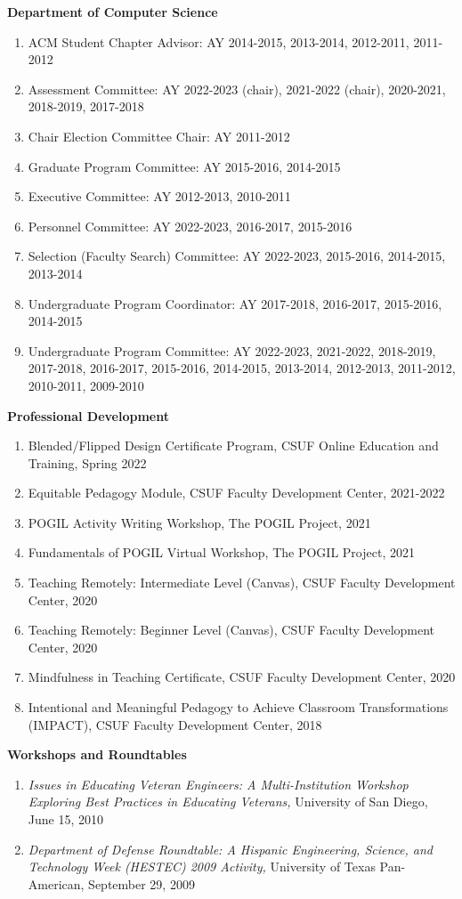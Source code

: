 \documentclass[11pt]{letter}
\begin{document}
\textbf{Department of Computer Science}
\begin{enumerate}
\item ACM Student Chapter Advisor: AY 2014-2015, 2013-2014, 2012-2011, 2011-2012
\item Assessment Committee: AY 2022-2023 (chair), 2021-2022 (chair), 2020-2021, 2018-2019, 2017-2018
\item Chair Election Committee Chair: AY 2011-2012
\item Graduate Program Committee: AY 2015-2016, 2014-2015
\item Executive Committee: AY 2012-2013, 2010-2011
\item Personnel Committee: AY 2022-2023, 2016-2017, 2015-2016
\item Selection (Faculty Search) Committee: AY 2022-2023, 2015-2016, 2014-2015, 2013-2014
\item Undergraduate Program Coordinator: AY 2017-2018, 2016-2017, 2015-2016, 2014-2015
\item Undergraduate Program Committee: AY 2022-2023, 2021-2022, 2018-2019, 2017-2018, 2016-2017, 2015-2016, 2014-2015, 2013-2014, 2012-2013, 2011-2012, 2010-2011, 2009-2010
\end{enumerate}

\textbf{Professional Development}
\begin{enumerate}
  \item Blended/Flipped Design Certificate Program, CSUF Online Education and Training, Spring 2022
  \item Equitable Pedagogy Module, CSUF Faculty Development Center, 2021-2022
  \item POGIL Activity Writing Workshop, The POGIL Project, 2021
  \item Fundamentals of POGIL Virtual Workshop, The POGIL Project, 2021
  \item Teaching Remotely: Intermediate Level (Canvas), CSUF Faculty Development Center, 2020
  \item Teaching Remotely: Beginner Level (Canvas), CSUF Faculty Development Center, 2020
  \item Mindfulness in Teaching Certificate, CSUF Faculty Development Center, 2020
  \item Intentional and Meaningful Pedagogy to Achieve Classroom Transformations (IMPACT), CSUF Faculty Development Center, 2018
\end{enumerate}

\textbf{Workshops and Roundtables}
\begin{enumerate}
\item \emph{Issues in Educating Veteran Engineers: A Multi-Institution Workshop Exploring Best Practices in Educating Veterans,} University of San Diego, June 15, 2010
\item \emph{Department of Defense Roundtable: A Hispanic Engineering, Science, and Technology Week (HESTEC) 2009 Activity,} University of Texas Pan-American, September 29, 2009
\end{enumerate}
\end{document}

